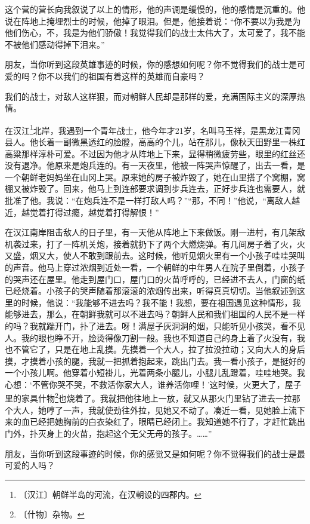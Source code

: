 \documentclass[12pt,UTF-8,openany]{ctexbook}
\begin{document}
\begin{normalsize}
    这个营的营长向我叙说了以上的情形，他的声调是缓慢的，他的感情是沉重的。他说在阵地上掩埋烈士的时候，他掉了眼泪。但是，他接着说：“你不要以为我是为他们伤心，不，我是为他们骄傲！我觉得我们的战士太伟大了，太可爱了，我不能不被他们感动得掉下泪来。”
    
    朋友，当你听到这段英雄事迹的时候，你的感想如何呢？你不觉得我们的战士是可爱的吗？你不以我们的祖国有着这样的英雄而自豪吗？
    
    我们的战士，对敌人这样狠，而对朝鲜人民却是那样的爱，充满国际主义的深厚热情。
    
    在汉江\footnote{〔汉江〕朝鲜半岛的河流，在汉朝设的四郡内。}北岸，我遇到一个青年战士，他今年才21岁，名叫马玉祥，是黑龙江青冈县人。他长着一副微黑透红的脸膛，高高的个儿，站在那儿，像秋天田野里一株红高粱那样淳朴可爱。不过因为他才从阵地上下来，显得稍微疲劳些，眼里的红丝还没有退净。他原来是炮兵连的。有一天夜里，他被一阵哭声惊醒了，出去一看，是一个朝鲜老妈妈坐在山冈上哭。原来她的房子被炸毁了，她在山里搭了个窝棚，窝棚又被炸毁了。回来，他马上到连部要求调到步兵连去，正好步兵连也需要人，就批准了他。我说：“在炮兵连不是一样打敌人吗？”“那，不同！”他说，“离敌人越近，越觉着打得过瘾，越觉着打得解恨！”
    
    在汉江南岸阻击敌人的日子里，有一天他从阵地上下来做饭。刚一进村，有几架敌机袭过来，打了一阵机关炮，接着就扔下了两个大燃烧弹。有几间房子着了火，火又盛，烟又大，使人不敢到跟前去。这时候，他听见烟火里有一个小孩子哇哇哭叫的声音。他马上穿过浓烟到近处一看，一个朝鲜的中年男人在院子里倒着，小孩子的哭声还在屋里。他走到屋门口，屋门口的火苗呼呼的，已经进不去人，门窗的纸已经烧着。小孩子的哭声随着那滚滚的浓烟传出来，听得真真切切。当他叙述到这里的时候，他说：“我能够不进去吗？我不能！我想，要在祖国遇见这种情形，我能够进去，那么，在朝鲜我就可以不进去吗？朝鲜人民和我们祖国的人民不是一样的吗？我就踹开门，扑了进去。呀！满屋子灰洞洞的烟，只能听见小孩哭，看不见人。我的眼也睁不开，脸烫得像刀割一般。我也不知道自己的身上着了火没有，我也不管它了，只是在地上乱摸。先摸着一个大人，拉了拉没拉动；又向大人的身后摸，才摸着小孩的腿，我就一把抓着抱起来，跳出门去。我一看小孩子，是挺好的一个小孩儿啊。他穿着小短褂儿，光着两条小腿儿，小腿儿乱蹬着，哇哇地哭。我心想：‘不管你哭不哭，不救活你家大人，谁养活你哩！’这时候，火更大了，屋子里的家具什物\footnote{〔什物〕杂物。}也烧着了。我就把他往地上一放，就又从那火门里钻了进去一拉那个大人，她哼了一声，我就使劲往外拉，见她又不动了。凑近一看，见她脸上流下来的血已经把她胸前的白衣染红了，眼睛已经闭上。我知道她不行了，才赶忙跳出门外，扑灭身上的火苗，抱起这个无父无母的孩子。……”
    
    朋友，当你听到这段事迹的时候，你的感觉又是如何呢？你不觉得我们的战士是最可爱的人吗？
    

\end{normalsize}
\end{document}
